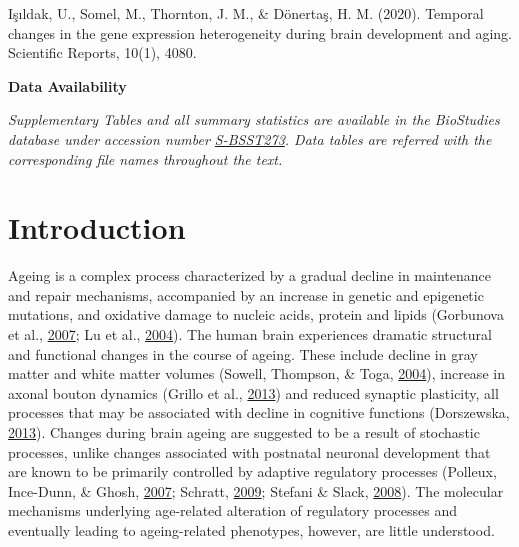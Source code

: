 \documentclass[12pt,twoside]{unicam}
\begin{document}
Işıldak, U., Somel, M., Thornton, J. M., \& Dönertaş, H. M. (2020). Temporal changes in the gene expression heterogeneity during brain development and aging. Scientific Reports, 10(1), 4080.

\textbf{Data Availability}

\emph{Supplementary Tables and all summary statistics are available in the BioStudies database under accession number \href{https://www.ebi.ac.uk/biostudies/studies/S-BSST273}{S-BSST273}. Data tables are referred with the corresponding file names throughout the text.}
\normalsize

\hypertarget{introduction-1}{%
\section{Introduction}\label{introduction-1}}

Ageing is a complex process characterized by a gradual decline in maintenance and repair mechanisms, accompanied by an increase in genetic and epigenetic mutations, and oxidative damage to nucleic acids, protein and lipids (Gorbunova et al., \protect\hyperlink{ref-Gorbunova2007}{2007}; Lu et al., \protect\hyperlink{ref-Lu2004}{2004}). The human brain experiences dramatic structural and functional changes in the course of ageing. These include decline in gray matter and white matter volumes (Sowell, Thompson, \& Toga, \protect\hyperlink{ref-Sowell2004}{2004}), increase in axonal bouton dynamics (Grillo et al., \protect\hyperlink{ref-Grillo2013}{2013}) and reduced synaptic plasticity, all processes that may be associated with decline in cognitive functions (Dorszewska, \protect\hyperlink{ref-Dorszewska2013}{2013}). Changes during brain ageing are suggested to be a result of stochastic processes, unlike changes associated with postnatal neuronal development that are known to be primarily controlled by adaptive regulatory processes (Polleux, Ince-Dunn, \& Ghosh, \protect\hyperlink{ref-Polleux2007}{2007}; Schratt, \protect\hyperlink{ref-Schratt2009}{2009}; Stefani \& Slack, \protect\hyperlink{ref-Stefani2008}{2008}). The molecular mechanisms underlying age-related alteration of regulatory processes and eventually leading to ageing-related phenotypes, however, are little understood.
\end{document}
